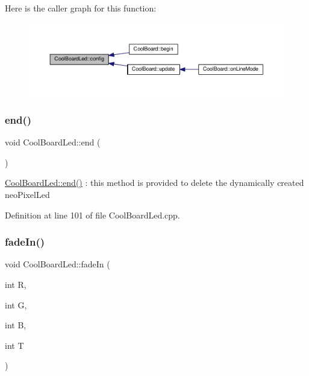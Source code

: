Here is the caller graph for this function\+:
\nopagebreak
\begin{figure}[H]
\begin{center}
\leavevmode
\includegraphics[width=350pt]{de/dc0/class_cool_board_led_a1b60e5e30bea96c49ed62ed1bf1ffc8b_icgraph}
\end{center}
\end{figure}
\mbox{\label{class_cool_board_led_a69f323359e0c9f797422f2152b5d41ef}} 
\subsubsection{\texorpdfstring{end()}{end()}}
{\footnotesize\ttfamily void Cool\+Board\+Led\+::end (\begin{DoxyParamCaption}{ }\end{DoxyParamCaption})}

\hyperlink{class_cool_board_led_a69f323359e0c9f797422f2152b5d41ef}{Cool\+Board\+Led\+::end()} \+: this method is provided to delete the dynamically created neo\+Pixel\+Led 

Definition at line 101 of file Cool\+Board\+Led.\+cpp.

\mbox{\label{class_cool_board_led_aec915442a8441c7cd45c3279d3ff8821}} 
\subsubsection{\texorpdfstring{fade\+In()}{fadeIn()}}
{\footnotesize\ttfamily void Cool\+Board\+Led\+::fade\+In (\begin{DoxyParamCaption}\item[{int}]{R,  }\item[{int}]{G,  }\item[{int}]{B,  }\item[{int}]{T }\end{DoxyParamCaption})}

